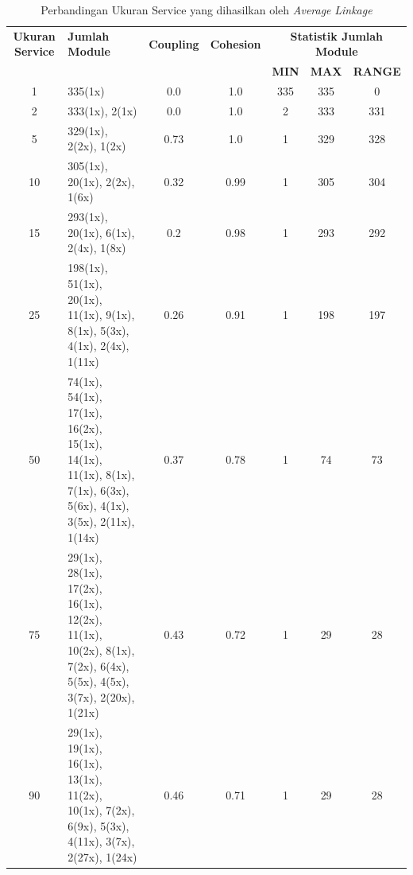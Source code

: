 \begingroup
\setlength{\LTleft}{-20cm plus -1fill}
\setlength{\LTright}{\LTleft}
\begin{small}
\begin{longtable}{|c|p{4cm}|c|c|c|c|c|}
	\caption{Perbandingan Ukuran Service yang dihasilkan oleh \textit{Average} \textit{Linkage}}
	\label{tab:service_stat_average} \\
	\hline
	\textbf{Ukuran Service} & \textbf{Jumlah Module} & \textbf{Coupling} & \textbf{Cohesion} & \multicolumn{3}{c|}{\textbf{Statistik Jumlah Module}} \\
	\cline{5-7}
	&  &  &  & \textbf{MIN} & \textbf{MAX} & \textbf{RANGE} \\
	\hline
	\endfirsthead
	\hline 
	1 & 335(1x) & \cellcolor{colorGood}  0.0 & \cellcolor{colorGood} 1.0 & 335 & 335 & \cellcolor{colorGood} 0 \\   \hline
2 & 333(1x), 2(1x) & \cellcolor{colorGood}  0.0 & \cellcolor{colorGood} 1.0 & 2 & 333 & \cellcolor{colorBad} 331 \\   \hline
5 & 329(1x), 2(2x), 1(2x) & \cellcolor{colorGood}  0.73 & \cellcolor{colorGood} 1.0 & 1 & 329 & \cellcolor{colorBad} 328 \\   \hline
10 & 305(1x), 20(1x), 2(2x), 1(6x) & \cellcolor{colorGood}  0.32 & \cellcolor{colorGood} 0.99 & 1 & 305 & \cellcolor{colorBad} 304 \\   \hline
15 & 293(1x), 20(1x), 6(1x), 2(4x), 1(8x) & \cellcolor{colorGood}  0.2 & \cellcolor{colorGood} 0.98 & 1 & 293 & \cellcolor{colorBad} 292 \\   \hline
25 & 198(1x), 51(1x), 20(1x), 11(1x), 9(1x), 8(1x), 5(3x), 4(1x), 2(4x), 1(11x) & \cellcolor{colorGood}  0.26 & \cellcolor{colorGood} 0.91 & 1 & 198 & \cellcolor{colorBad} 197 \\   \hline
50 & 74(1x), 54(1x), 17(1x), 16(2x), 15(1x), 14(1x), 11(1x), 8(1x), 7(1x), 6(3x), 5(6x), 4(1x), 3(5x), 2(11x), 1(14x) & \cellcolor{colorGood}  0.37 & \cellcolor{colorGood} 0.78 & 1 & 74 & \cellcolor{colorBad} 73 \\   \hline
75 & 29(1x), 28(1x), 17(2x), 16(1x), 12(2x), 11(1x), 10(2x), 8(1x), 7(2x), 6(4x), 5(5x), 4(5x), 3(7x), 2(20x), 1(21x) & \cellcolor{colorGood}  0.43 & \cellcolor{colorGood} 0.72 & 1 & 29 & \cellcolor{colorBad} 28 \\   \hline
90 & 29(1x), 19(1x), 16(1x), 13(1x), 11(2x), 10(1x), 7(2x), 6(9x), 5(3x), 4(11x), 3(7x), 2(27x), 1(24x) & \cellcolor{colorGood}  0.46 & \cellcolor{colorGood} 0.71 & 1 & 29 & \cellcolor{colorBad} 28 \\   \hline

\end{longtable}
\end{small}
